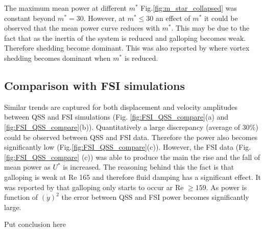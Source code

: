  

The maximum mean power at different $m^*$ Fig.\ref{fig:m_star_collapsed} was constant beyond $m^*=30$. However, at $m^* \leq 30$ an effect of $m^*$ it could be observed that the mean power curve reduces with $m^*$. This may be due to the fact that as the inertia of the system is reduced and galloping becomes weak. Therefore shedding become dominant. This was also reported by \cite{Joly2012} where vortex shedding becomes dominant when $m^*$ is reduced. 

 

\subsection{Comparison with FSI simulations}
 Similar trends are captured for both displacement and velocity amplitudes between QSS and FSI simulations (Fig. \ref{fig:FSI_QSS_compare}(a) and \ref{fig:FSI_QSS_compare}(b)). Quantitatively a large discrepancy (average of $30\%$) could be observed between QSS and FSI data. Therefore the power also becomes significantly low (Fig.\ref{fig:FSI_QSS_compare}(c)). However, the FSI data (Fig.\ref{fig:FSI_QSS_compare} (c)) was able to produce the main the rise and the fall of mean power as $U^*$ is increased. The reasoning behind this the fact is that galloping is weak at Re 165  and therefore fluid damping has a significant effect. It was reported by \cite{Barrero-Gil2009} that galloping only starts to occur ar Re $\geq 159$. As power is function of $(\dot{y})^2$ the error between QSS and FSI power becomes significantly large.  
 
 Put conclusion here 
 
 










 

 
 
 

 
 



 
 
 
 
 
 
 
 
 
 
  
 
 